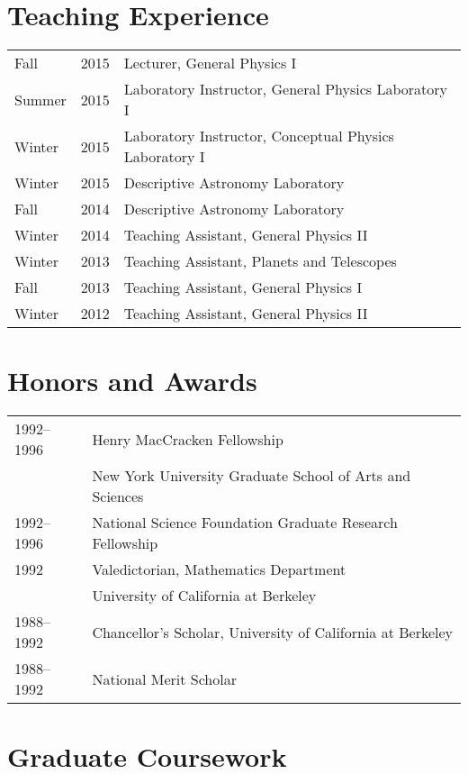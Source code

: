 \documentclass[margin,line,pifont,palatino,courier]{cv_short_current}
\newenvironment{list1}{
  \begin{list}{\ding{113}}{%
      \setlength{\itemsep}{0in}
      \setlength{\parsep}{0in} \setlength{\parskip}{0in}
      \setlength{\topsep}{0in} \setlength{\partopsep}{0in}
      \setlength{\leftmargin}{0.17in}}}{\end{list}}
\begin{document}
\begin{resume}
\begin{list1}
\newpage

\section{\sc Teaching Experience}

\begin{tabular}{@{}p{0.4in}p{0.3in}p{4in}}
Fall & 2015 & Lecturer, General Physics I\\
Summer & 2015 & Laboratory Instructor, General Physics Laboratory I\\
Winter & 2015 & Laboratory Instructor, Conceptual Physics Laboratory I\\
Winter & 2015 & Descriptive Astronomy Laboratory\\
Fall & 2014 & Descriptive Astronomy Laboratory\\
Winter & 2014 & Teaching Assistant, General Physics II\\
Winter & 2013 & Teaching Assistant, Planets and Telescopes\\
Fall & 2013 & Teaching Assistant, General Physics I\\
Winter & 2012 & Teaching Assistant, General Physics II\\
\end{tabular}


\section{\sc Honors and Awards}

\begin{tabular}{@{}p{0.8in}p{4in}}
1992--1996 & Henry MacCracken Fellowship\\
           & New York University Graduate School of Arts and Sciences  \\
1992--1996 & National Science Foundation Graduate Research Fellowship  \\
1992    & Valedictorian, Mathematics Department  \\
           & University of California at Berkeley\\
1988--1992 & Chancellor's Scholar, University of California at Berkeley \\
1988--1992 & National Merit Scholar\\
\end{tabular}


\section{\sc Graduate Coursework}


\end{list1}
\end{resume}
\end{document}
